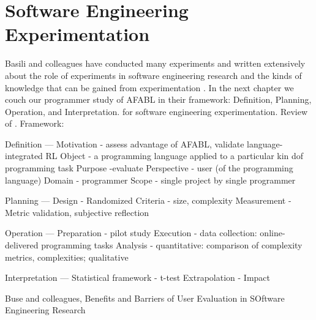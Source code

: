\section{Software Engineering Experimentation}

Basili and colleagues have conducted many experiments and written extensively about the role of experiments in software engineering research and the kinds of knowledge that can be gained from experimentation \cite{basili2007role,basili1986a-experimentation}. In the next chapter we couch our programmer study of AFABL in their framework: Definition, Planning, Operation, and Interpretation. for software engineering experimentation. Review of . Framework:

Definition
---
Motivation - assess advantage of AFABL, validate language-integrated RL
Object - a programming language applied to a particular kin dof programming task
Purpose -evaluate
Perspective - user (of the programming language)
Domain - programmer
Scope - single project by single programmer

Planning
---
Design - Randomized
Criteria - size, complexity
Measurement - Metric validation, subjective reflection

Operation
---
Preparation - pilot study
Execution - data collection: online-delivered programming tasks
Analysis - quantitative: comparison of complexity metrics, complexities; qualitative

Interpretation
---
Statistical framework - t-test
Extrapolation -
Impact


Buse and colleagues, Benefits and Barriers of User Evaluation in SOftware Engineering Research \cite{buse2011a-benefits}
